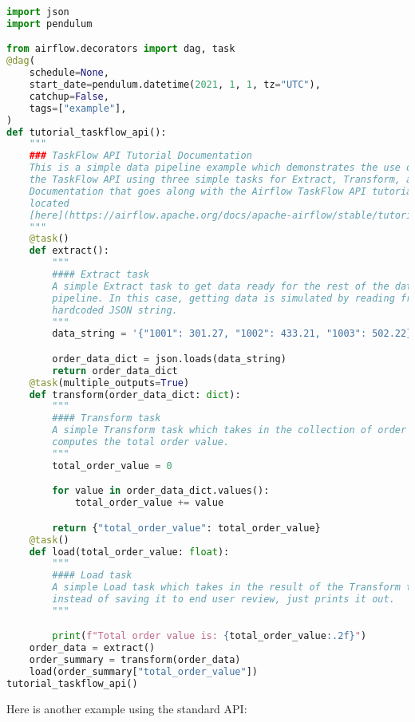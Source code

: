 \begin{lstlisting}[language=python]
import json
import pendulum

from airflow.decorators import dag, task
@dag(
    schedule=None,
    start_date=pendulum.datetime(2021, 1, 1, tz="UTC"),
    catchup=False,
    tags=["example"],
)
def tutorial_taskflow_api():
    """
    ### TaskFlow API Tutorial Documentation
    This is a simple data pipeline example which demonstrates the use of
    the TaskFlow API using three simple tasks for Extract, Transform, and Load.
    Documentation that goes along with the Airflow TaskFlow API tutorial is
    located
    [here](https://airflow.apache.org/docs/apache-airflow/stable/tutorial_taskflow_api.html)
    """
    @task()
    def extract():
        """
        #### Extract task
        A simple Extract task to get data ready for the rest of the data
        pipeline. In this case, getting data is simulated by reading from a
        hardcoded JSON string.
        """
        data_string = '{"1001": 301.27, "1002": 433.21, "1003": 502.22}'

        order_data_dict = json.loads(data_string)
        return order_data_dict
    @task(multiple_outputs=True)
    def transform(order_data_dict: dict):
        """
        #### Transform task
        A simple Transform task which takes in the collection of order data and
        computes the total order value.
        """
        total_order_value = 0

        for value in order_data_dict.values():
            total_order_value += value

        return {"total_order_value": total_order_value}
    @task()
    def load(total_order_value: float):
        """
        #### Load task
        A simple Load task which takes in the result of the Transform task and
        instead of saving it to end user review, just prints it out.
        """

        print(f"Total order value is: {total_order_value:.2f}")
    order_data = extract()
    order_summary = transform(order_data)
    load(order_summary["total_order_value"])
tutorial_taskflow_api()

\end{lstlisting}

Here is another example using the standard API:


